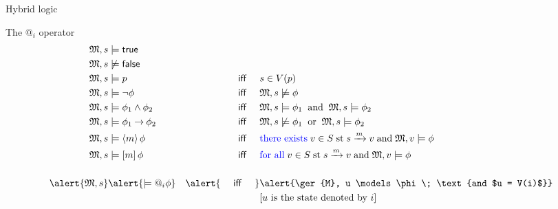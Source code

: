 \documentclass[aspectratio=169]{beamer}
\begin{document}
\begin{slide}{Hybrid logic}\label{s:48}
\small

\begin{block}{The $@_i$ operator}
\begin{align*}
\ger{M}, s & \models \true &&\\
\ger{M}, s & \not \models  \false &&\\
\ger{M}, s & \models  p &  \text{~~~ \textsf{iff} ~~~}  & s \in V(p)\\
\ger{M}, s  & \models \neg \phi  & \text{~~~ \textsf{iff} ~~~} & \ger{M}, s  \not \models \phi \\
\ger{M}, s & \models \phi_1 \e \phi_2  &\text{~~~ \textsf{iff} ~~~} & \ger{M}, s \models  \phi_1 \;\; \text{and}\;\;
                                                   \ger{M}, s \models  \phi_2 \\
\ger{M}, s & \models \phi_1 \impp \phi_2 & \text{~~~ \textsf{iff} ~~~} & \ger{M}, s \not \models \phi_1  \;\; \text{or}\;\; 
                                                  \ger{M}, s \models \phi_2 \\
\ger{M}, s  &\models \pv{m}{\phi} & \text{ ~~~ \textsf{iff} ~~~} &
\text{\blue{there exists}}\; v \in S \;\text{st}\; s \xrightarrow{m} v\; \text{and}\; \ger{M}, v \models \phi\\
\ger{M}, s & \models \nc{m}{\phi} & \text{~~~ \textsf{iff} ~~~} &
\text{\blue{for all}}\; v \in S \; \text{st}\; s \xrightarrow{m} v\; \text{and}\; \ger{M}, v \models \phi
\\[5mm]
\alert{\ger{M}, s} & \alert{\models  @_i \phi}
  &  \alert{\text{~~~ \textsf{iff} ~~~}}  & \alert{\ger{M}, u  \models \phi\; \text{and $u = V(i)$}}
  \\&&& \text{[$u$ is the state denoted by $i$]}
\end{align*}
\end{block}

\end{slide}
\end{document}
